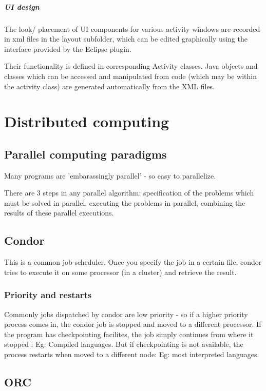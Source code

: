 \documentclass[oneside, article]{memoir}
\begin{document}
\subsubsection{UI design}
The look/ placement of UI components for various activity windows are recorded in xml files in the layout subfolder, which can be edited graphically using the interface provided by the Eclipse plugin.

Their functionality is defined in corresponding Activity classes. Java objects and classes which can be accessed and manipulated from code (which may be within the activity class) are generated automatically from the XML files.

\part{Distributed computing}
\chapter{Parallel computing paradigms}
Many programs are 'embarassingly parallel' - so easy to parallelize.

There are 3 steps in any parallel algorithm: specification of the problems which must be solved in parallel, executing the problems in parallel, combining the results of these parallel executions.

\chapter{Condor}
This is a common job-scheduler. Once you specify the job in a certain file, condor tries to execute it on some processor (in a cluster) and retrieve the result.

\section{Priority and restarts}
Commonly jobs dispatched by condor are low priority - so if a higher priority process comes in, the condor job is stopped and moved to a different processor. If the program has checkpointing facilites, the job simply continues from where it stopped : Eg: Compiled languages. But if checkpointing is not available, the process restarts when moved to a different node: Eg: most interpreted languages.

\chapter{ORC}
\end{document}
